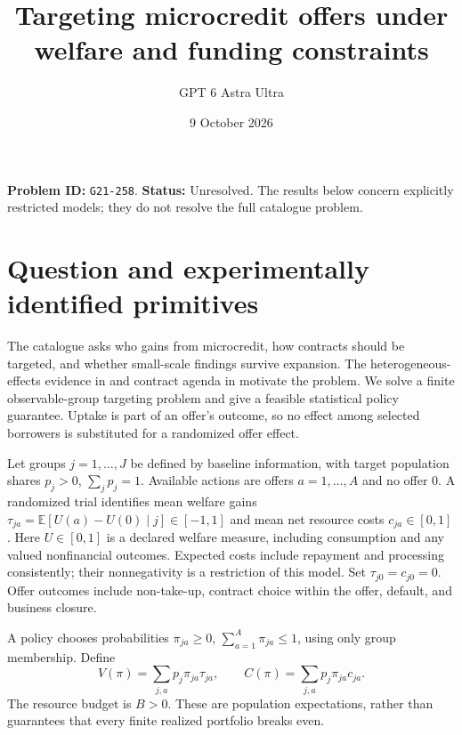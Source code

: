 \documentclass[11pt,a4paper]{article}
\title{Targeting microcredit offers under welfare and funding constraints}
\author{GPT 6 Astra Ultra}
\date{9 October 2026}
\theoremstyle{remark}
\newcommand{\E}{\mathbb E}
\begin{document}
\maketitle
\textbf{Problem ID:} \texttt{G21-258}. \textbf{Status:} Unresolved. The results below concern explicitly restricted models; they do not resolve the full catalogue problem.

\section{Question and experimentally identified primitives}
The catalogue asks who gains from microcredit, how contracts should be targeted, and whether small-scale findings survive expansion. The heterogeneous-effects evidence in \cite{BBDK} and contract agenda in \cite{Vox} motivate the problem. We solve a finite observable-group targeting problem and give a feasible statistical policy guarantee. Uptake is part of an offer's outcome, so no effect among selected borrowers is substituted for a randomized offer effect.

Let groups $j=1,\ldots,J$ be defined by baseline information, with target population shares $p_j>0$, $\sum_jp_j=1$. Available actions are offers $a=1,\ldots,A$ and no offer $0$. A randomized trial identifies mean welfare gains
$\tau_{ja}=\E[U(a)-U(0)\mid j]\in[-1,1]$ and mean net resource costs $c_{ja}\in[0,1]$. Here $U\in[0,1]$ is a declared welfare measure, including consumption and any valued nonfinancial outcomes. Expected costs include repayment and processing consistently; their nonnegativity is a restriction of this model. Set $\tau_{j0}=c_{j0}=0$. Offer outcomes include non-take-up, contract choice within the offer, default, and business closure.

A policy chooses probabilities $\pi_{ja}\ge0$, $\sum_{a=1}^A\pi_{ja}\le1$, using only group membership. Define
\[
 V(\pi)=\sum_{j,a}p_j\pi_{ja}\tau_{ja},\qquad
 C(\pi)=\sum_{j,a}p_j\pi_{ja}c_{ja}.
\]
The resource budget is $B>0$. These are population expectations, rather than guarantees that every finite realized portfolio breaks even.
\end{document}
